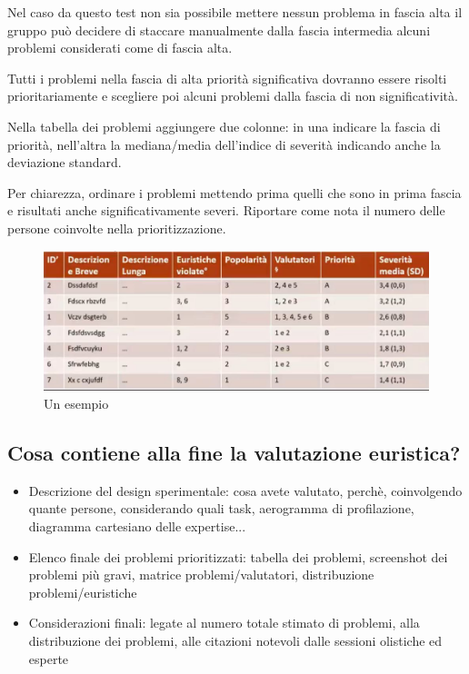 \documentclass[11pt,a4paper]{book}
\begin{document}
Nel caso da questo test non sia possibile mettere nessun problema in fascia alta il gruppo può decidere di staccare manualmente dalla fascia intermedia alcuni problemi considerati come di fascia alta.

Tutti i problemi nella fascia di alta priorità significativa dovranno essere risolti prioritariamente e scegliere poi alcuni problemi dalla fascia di non significatività.

Nella tabella dei problemi aggiungere due colonne: in una indicare la fascia di priorità, nell'altra la mediana/media dell'indice di severità indicando anche la deviazione standard.

Per chiarezza, ordinare i problemi mettendo prima quelli che sono in prima fascia e risultati anche significativamente severi. Riportare come nota il numero delle persone coinvolte nella prioritizzazione.

\begin{figure}[h!]
	\begin{center}
		\includegraphics[scale=0.6]{img/018.jpg}
		\caption{Un esempio}
		\label{fig: 018}
	\end{center}
\end{figure}

\subsection{Cosa contiene alla fine la valutazione euristica?}
\begin{itemize}
	\item Descrizione del design sperimentale: cosa avete valutato, perchè, coinvolgendo quante persone, considerando quali task, aerogramma di profilazione, diagramma cartesiano delle expertise...
	\item Elenco finale dei problemi prioritizzati: tabella dei problemi, screenshot dei problemi più gravi, matrice problemi/valutatori, distribuzione problemi/euristiche
	\item Considerazioni finali: legate al numero totale stimato di problemi, alla distribuzione dei problemi, alle citazioni notevoli dalle sessioni olistiche ed esperte
\end{itemize}
\end{document}
